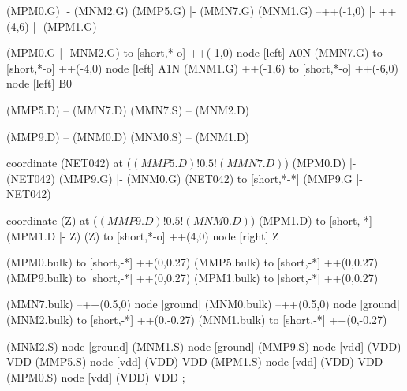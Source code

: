 \begin{circuitikz}[american]
	(MPM0.G) |- (MNM2.G)
	(MMP5.G) |- (MMN7.G)
	(MNM1.G) --++(-1,0) |- ++(4,6) |- (MPM1.G) 
	
	(MPM0.G |- MNM2.G) to [short,*-o] ++(-1,0) node [left] {A0N} 
	(MMN7.G) to [short,*-o] ++(-4,0) node [left] {A1N}
	(MNM1.G) ++(-1,6) to [short,*-o] ++(-6,0) node [left] {B0}
	
	(MMP5.D) -- (MMN7.D)
	(MMN7.S) -- (MNM2.D)
	
	(MMP9.D) -- (MNM0.D)
	(MNM0.S) -- (MNM1.D)
	
	coordinate (NET042) at ($(MMP5.D)!0.5!(MMN7.D)$)
	(MPM0.D) |- (NET042) 
	(MMP9.G) |- (MNM0.G)
	(NET042) to [short,*-*] (MMP9.G |- NET042)
	
	coordinate (Z) at ($(MMP9.D)!0.5!(MNM0.D)$)
	(MPM1.D) to [short,-*] (MPM1.D |- Z)
	(Z) to [short,*-o] ++(4,0) node [right] {Z}
	
	(MPM0.bulk) to [short,-*] ++(0,0.27)
	(MMP5.bulk) to [short,-*] ++(0,0.27)
	(MMP9.bulk) to [short,-*] ++(0,0.27)
	(MPM1.bulk) to [short,-*] ++(0,0.27)
	
	(MMN7.bulk) --++(0.5,0) node [ground]{}
	(MNM0.bulk) --++(0.5,0) node [ground]{}
	(MNM2.bulk) to [short,-*] ++(0,-0.27)	
	(MNM1.bulk) to [short,-*] ++(0,-0.27)
	

	(MNM2.S) node [ground] {}
	(MNM1.S) node [ground] {}
	(MMP9.S) node [vdd] (VDD) {VDD}
	(MMP5.S) node [vdd] (VDD) {VDD}
	(MPM1.S) node [vdd] (VDD) {VDD}
	(MPM0.S) node [vdd] (VDD) {VDD}
;

\end{circuitikz}
